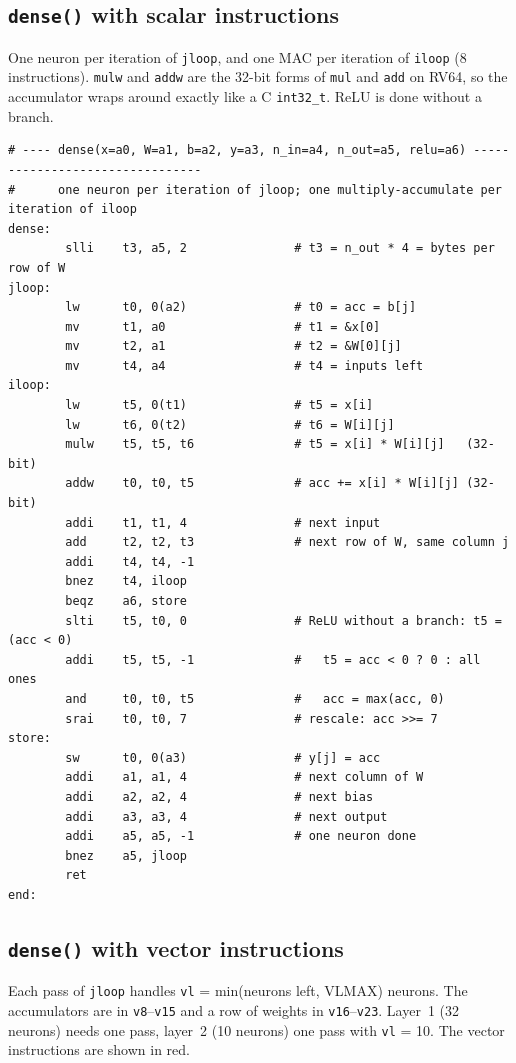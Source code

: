 \documentclass[11pt,a4paper]{article}
\newcommand{\code}[1]{\texttt{#1}}
\begin{document}
\subsection{\code{dense()} with scalar instructions}

One neuron per iteration of \code{jloop}, and one MAC per iteration of \code{iloop} (8
instructions). \code{mulw} and \code{addw} are the 32-bit forms of \code{mul} and \code{add} on
RV64, so the accumulator wraps around exactly like a C \code{int32\_t}. ReLU is done without a
branch.

\begin{lstlisting}[style=asm]
# ---- dense(x=a0, W=a1, b=a2, y=a3, n_in=a4, n_out=a5, relu=a6) --------------------------------
#      one neuron per iteration of jloop; one multiply-accumulate per iteration of iloop
dense:
        slli    t3, a5, 2               # t3 = n_out * 4 = bytes per row of W
jloop:
        lw      t0, 0(a2)               # t0 = acc = b[j]
        mv      t1, a0                  # t1 = &x[0]
        mv      t2, a1                  # t2 = &W[0][j]
        mv      t4, a4                  # t4 = inputs left
iloop:
        lw      t5, 0(t1)               # t5 = x[i]
        lw      t6, 0(t2)               # t6 = W[i][j]
        mulw    t5, t5, t6              # t5 = x[i] * W[i][j]   (32-bit)
        addw    t0, t0, t5              # acc += x[i] * W[i][j] (32-bit)
        addi    t1, t1, 4               # next input
        add     t2, t2, t3              # next row of W, same column j
        addi    t4, t4, -1
        bnez    t4, iloop
        beqz    a6, store
        slti    t5, t0, 0               # ReLU without a branch: t5 = (acc < 0)
        addi    t5, t5, -1              #   t5 = acc < 0 ? 0 : all ones
        and     t0, t0, t5              #   acc = max(acc, 0)
        srai    t0, t0, 7               # rescale: acc >>= 7
store:
        sw      t0, 0(a3)               # y[j] = acc
        addi    a1, a1, 4               # next column of W
        addi    a2, a2, 4               # next bias
        addi    a3, a3, 4               # next output
        addi    a5, a5, -1              # one neuron done
        bnez    a5, jloop
        ret
end:
\end{lstlisting}

\subsection{\code{dense()} with vector instructions}

Each pass of \code{jloop} handles \code{vl} = min(neurons left, VLMAX) neurons. The accumulators
are in \code{v8}--\code{v15} and a row of weights in \code{v16}--\code{v23}. Layer~1 (32 neurons)
needs one pass, layer~2 (10 neurons) one pass with \code{vl} = 10. The vector instructions are
shown in red.
\end{document}
